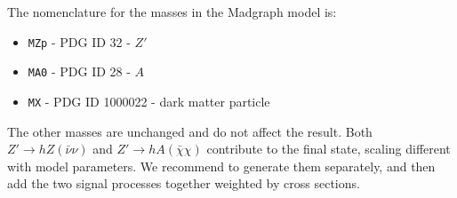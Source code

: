 The nomenclature for the masses in the Madgraph model is:
 \begin{itemize}
 	\item \texttt{MZp} - PDG ID 32 - $Z'$
 	\item \texttt{MA0} - PDG ID 28 - $A$
 	\item \texttt{MX} - PDG ID 1000022 - dark matter particle
 \end{itemize}
 
The other masses are unchanged and do not affect the result. 
 Both $Z' \to hZ(\bar \nu \nu)$ and  $Z' \to hA(\bar \chi \chi)$ contribute to the final state, scaling
 different with model parameters. We recommend to generate them separately, 
 and then add the two signal processes together weighted by cross sections.
 

